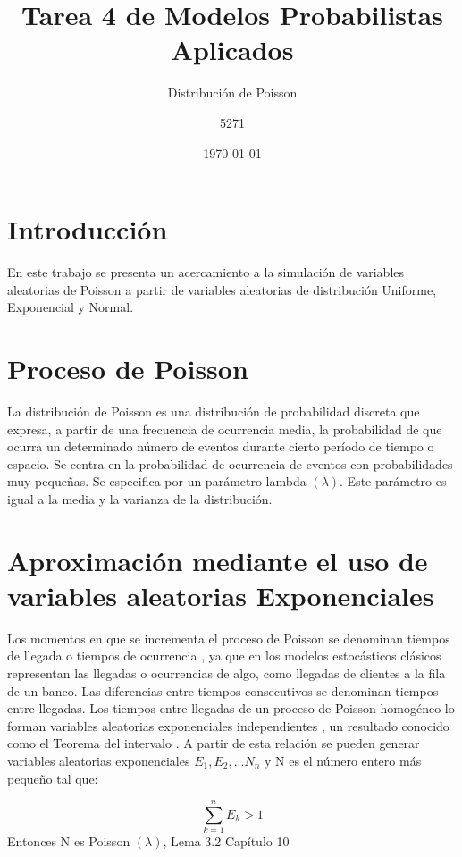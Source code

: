 \documentclass{article}
\title{Tarea 4 de Modelos Probabilistas Aplicados}
\subtitle{Distribución de Poisson}
\author{5271}
\date{\today}
\begin{document}
\maketitle

\section{Introducción}

En este trabajo se presenta un acercamiento a la simulación de variables aleatorias de Poisson a partir de variables aleatorias de distribución Uniforme, Exponencial y Normal. 

\section{Proceso de Poisson}

La distribución de Poisson es una distribución de probabilidad discreta que expresa, a partir de una frecuencia de ocurrencia media, la probabilidad de que ocurra un determinado número de eventos durante cierto período de tiempo o espacio. Se centra en la probabilidad de ocurrencia de eventos con probabilidades muy pequeñas. Se especifica por un parámetro lambda $(\lambda)$. Este parámetro es igual a la media y la varianza de la distribución. 

\section{Aproximación mediante el uso de variables aleatorias Exponenciales }

Los momentos en que se incrementa el proceso de Poisson se denominan tiempos de llegada o tiempos de ocurrencia , ya que en los modelos estocásticos clásicos representan las llegadas o ocurrencias de algo, como llegadas de clientes a la fila de un banco. Las diferencias entre tiempos consecutivos se denominan tiempos entre llegadas. Los tiempos entre llegadas de un proceso de Poisson homogéneo lo forman variables aleatorias exponenciales independientes , un resultado conocido como el Teorema del intervalo . A partir de esta relación se pueden generar variables aleatorias exponenciales $E_{1}, E_{2},...N_{n}$ y N es el número entero más pequeño tal que:

\begin{equation}
    \sum_{k=1}^{n}E_{k}>1 
\end{equation}
Entonces N es Poisson $(\lambda)$, Lema 3.2 Capítulo 10 \cite{expvar}  
\end{document}
